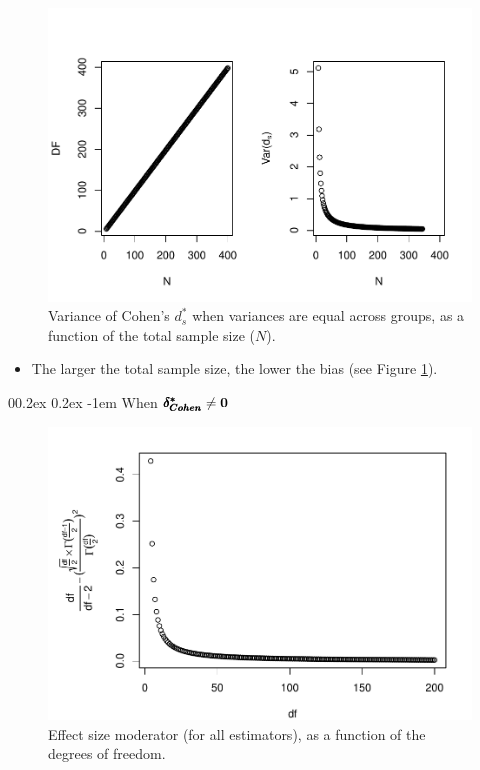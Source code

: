 \documentclass[
  english,
  man,mask]{apa6}
\makeatletter
\providecommand{\tightlist}{%
  \setlength{\itemsep}{0pt}\setlength{\parskip}{0pt}}
\let\oldparagraph\paragraph
\renewcommand{\paragraph}[1]{\oldparagraph{#1}\mbox{}}
\renewcommand{\paragraph}{\@startsection{paragraph}{4}{\parindent}%
  {0\baselineskip \@plus 0.2ex \@minus 0.2ex}%
  {-1em}%
  {\normalfont\normalsize\bfseries\itshape\typesectitle}}
\makeatother
\begin{document}
\begin{figure}
\centering
\includegraphics{Theoretical-Variance-of-all-estimators-as-a-function-of-population-parameters_files/figure-latex/varcohendprimehomNsize2-1.pdf}
\caption{\label{fig:varcohendprimehomNsize2}Variance of Cohen's \(d^*_s\) when variances are equal across groups, as a function of the total sample size (\(N\)).}
\end{figure}

\begin{itemize}
\tightlist
\item
  The larger the total sample size, the lower the bias (see Figure \ref{fig:varcohendprimehomNsize2}).
\end{itemize}

\hypertarget{when-bf-pmbdelta_cohen-neq-0-1}{%
\paragraph{\texorpdfstring{When \(\bf \pmb{\delta^*_{Cohen}} \neq 0\)}{When \textbackslash bf \textbackslash pmb\{\textbackslash delta\^{}*\_\{Cohen\}\} \textbackslash neq 0}}\label{when-bf-pmbdelta_cohen-neq-0-1}}

\begin{figure}
\centering
\includegraphics{Theoretical-Variance-of-all-estimators-as-a-function-of-population-parameters_files/figure-latex/ESmoderator2-1.pdf}
\caption{\label{fig:ESmoderator2}Effect size moderator (for all estimators), as a function of the degrees of freedom.}
\end{figure}
\end{document}

